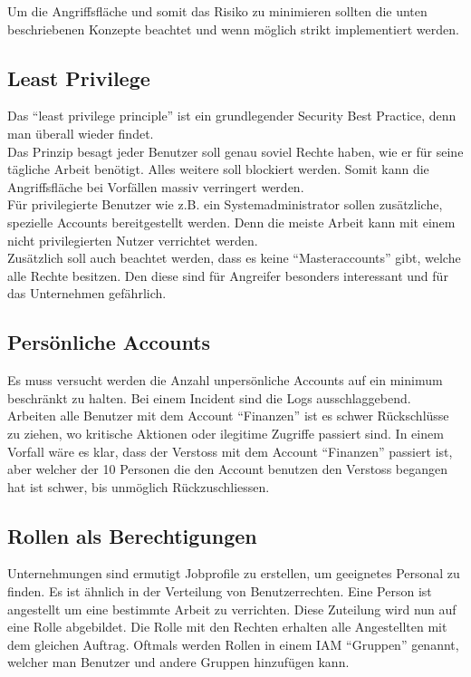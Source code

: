 Um die Angriffsfläche und somit das Risiko zu minimieren sollten die unten beschriebenen Konzepte beachtet und wenn möglich strikt implementiert werden.

\subsection{Least Privilege}
Das ``least privilege principle'' ist ein grundlegender Security Best Practice, denn man überall wieder findet.\\

Das Prinzip besagt jeder Benutzer soll genau soviel Rechte haben, wie er für seine tägliche Arbeit benötigt. Alles weitere soll blockiert werden.
Somit kann die Angriffsfläche bei Vorfällen massiv verringert werden.\\

Für privilegierte Benutzer wie z.B. ein Systemadministrator sollen zusätzliche, spezielle Accounts bereitgestellt werden.
Denn die meiste Arbeit kann mit einem nicht privilegierten Nutzer verrichtet werden.\\

Zusätzlich soll auch beachtet werden, dass es keine ``Masteraccounts'' gibt, welche alle Rechte besitzen.
Den diese sind für Angreifer besonders interessant und für das Unternehmen gefährlich.


\subsection{Persönliche Accounts}
Es muss versucht werden die Anzahl unpersönliche Accounts auf ein minimum beschränkt zu halten.
Bei einem Incident sind die Logs ausschlaggebend.\\

Arbeiten alle Benutzer mit dem Account ``Finanzen'' ist es schwer Rückschlüsse zu ziehen, wo kritische Aktionen oder ilegitime Zugriffe passiert sind.
In einem Vorfall wäre es klar, dass der Verstoss mit dem Account ``Finanzen'' passiert ist, aber welcher der 10 Personen die den Account benutzen den Verstoss begangen hat ist schwer, bis unmöglich Rückzuschliessen.

\subsection{Rollen als Berechtigungen}
Unternehmungen sind ermutigt Jobprofile zu erstellen, um geeignetes Personal zu finden.
Es ist ähnlich in der Verteilung von Benutzerrechten.
Eine Person ist angestellt um eine bestimmte Arbeit zu verrichten.
Diese Zuteilung wird nun auf eine Rolle abgebildet.
Die Rolle mit den Rechten erhalten alle Angestellten mit dem gleichen Auftrag.
Oftmals werden Rollen in einem IAM ``Gruppen'' genannt, welcher man Benutzer und andere Gruppen hinzufügen kann.\\

